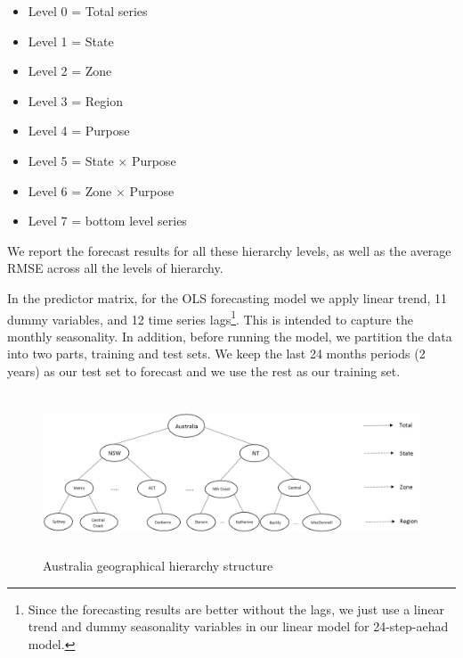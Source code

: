 \documentclass[11pt,a4paper,]{article}
\providecommand{\tightlist}{%
  \setlength{\itemsep}{0pt}\setlength{\parskip}{0pt}}
\begin{document}
\begin{itemize}
\tightlist
\item
  Level 0 = Total series
\item
  Level 1 = State
\item
  Level 2 = Zone
\item
  Level 3 = Region
\item
  Level 4 = Purpose
\item
  Level 5 = State \(\times\) Purpose
\item
  Level 6 = Zone \(\times\) Purpose
\item
  Level 7 = bottom level series
\end{itemize}

We report the forecast results for all these hierarchy levels, as well
as the average RMSE across all the levels of hierarchy.

In the predictor matrix, for the OLS forecasting model we apply linear
trend, 11 dummy variables, and 12 time series lags\footnote{Since the
  forecasting results are better without the lags, we just use a linear
  trend and dummy seasonality variables in our linear model for
  24-step-aehad model.}. This is intended to capture the monthly
seasonality. In addition, before running the model, we partition the
data into two parts, training and test sets. We keep the last 24 months
periods (2 years) as our test set to forecast and we use the rest as our
training set.

\begin{figure}

{\centering \includegraphics[width=450px,height=180px]{Paper-Figures/Australian_hierarchy_structure} 

}

\caption{Australia geographical hierarchy structure}\label{fig:Australiahierarchystructure}
\end{figure}
\end{document}
